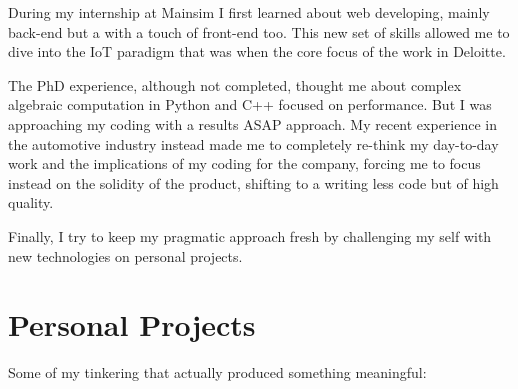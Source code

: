 \documentclass[]{friggeri-cv}
\begin{document}
	During my internship at Mainsim I first learned about web developing, mainly back-end but a with a touch of front-end too. This new set of skills allowed me to dive into the IoT paradigm that was when the core focus of the work in Deloitte.

    The PhD experience, although not completed, thought me about complex algebraic computation in Python and C++ focused on performance. But I was approaching my coding with a results ASAP approach. My recent experience in the automotive industry instead made me to completely re-think my day-to-day work and the implications of my coding for the company, forcing me to focus instead on the solidity of the product, shifting to a writing less code but of high quality.
	
    Finally, I try to keep my pragmatic approach fresh by challenging my self with new technologies on personal projects. 
	
\section{Personal Projects}

Some of my tinkering that actually produced something meaningful:
\end{document}
